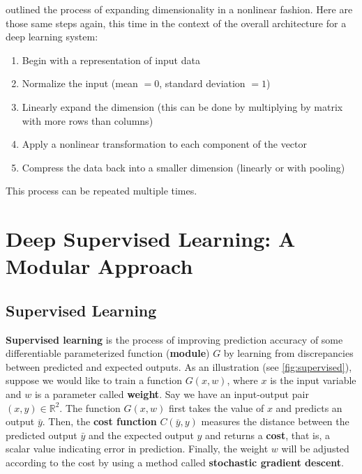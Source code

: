  outlined the process of expanding dimensionality in a nonlinear fashion.
Here are those same steps again, this time in the context of the overall architecture for a deep learning system:
\begin{enumerate}
    \item Begin with a representation of input data
    \item Normalize the input (mean $= 0$, standard deviation $= 1$)
    \item Linearly expand the dimension (this can be done by multiplying by matrix with more rows than columns)
    \item Apply a nonlinear transformation to each component of the vector
    \item Compress the data back into a smaller dimension (linearly or with pooling) 
\end{enumerate}
This process can be repeated multiple times.

\chapter{Deep Supervised Learning: A Modular Approach}

\section{Supervised Learning}\label{sec: supervised learning}

\textbf{Supervised learning} is the process of improving prediction accuracy of some differentiable parameterized function (\textbf{module}) $G$ by learning from discrepancies between predicted and expected outputs.
As an illustration (see \cref{fig:supervised}), suppose we would like to train a function $G(x,w)$, where $x$ is the input variable and $w$ is a parameter called \textbf{weight}.
Say we have an input-output pair $(x,y)\in \mathbb{R}^2$.
The function $G(x,w)$ first takes the value of $x$ and predicts an output $\bar{y}$.
Then, the \textbf{cost function} $C(\bar{y},y)$ measures the distance between the predicted output $\bar{y}$ and the expected output $y$ and returns a \textbf{cost}, that is, a scalar value indicating error in prediction.
Finally, the weight $w$ will be adjusted according to the cost by using a method called \textbf{stochastic gradient descent}. 

